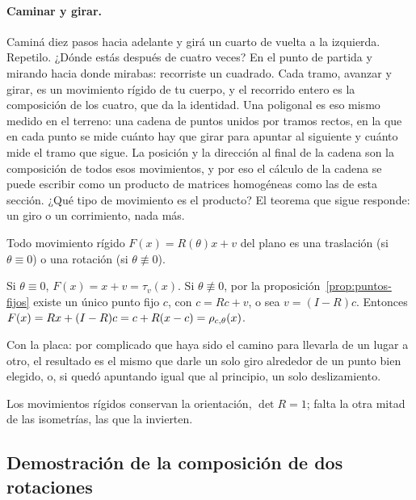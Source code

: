 \paragraph{Caminar y girar.}
Caminá diez pasos hacia adelante y girá un cuarto de vuelta a la izquierda. Repetilo. ¿Dónde
estás después de cuatro veces? En el punto de partida y mirando hacia donde mirabas: recorriste
un cuadrado. Cada tramo, avanzar y girar, es un movimiento rígido de tu cuerpo, y el recorrido
entero es la composición de los cuatro, que da la identidad. Una poligonal es eso mismo medido
en el terreno: una cadena de puntos unidos por tramos rectos, en la que en cada punto se mide
cuánto hay que girar para apuntar al siguiente y cuánto mide el tramo que sigue. La posición y
la dirección al final de la cadena son la composición de todos esos movimientos, y por eso el
cálculo de la cadena se puede escribir como un producto de matrices homogéneas como las de
esta sección. ¿Qué tipo de movimiento es el producto? El teorema que sigue responde: un giro o
un corrimiento, nada más.

\begin{teorema}\label{teo:clasificacion-rigidos}
Todo movimiento rígido \(F(x)=R(\theta)x+v\) del plano es una traslación (si
\(\theta\equiv0\)) o una rotación (si \(\theta\not\equiv0\)).
\end{teorema}

\begin{demostracion}
Si \(\theta\equiv0\), \(F(x)=x+v=\tau_v(x)\). Si \(\theta\not\equiv0\), por la
proposición~\ref{prop:puntos-fijos} existe un único punto fijo \(c\), con \(c=Rc+v\), o sea
\(v=(I-R)c\). Entonces \(F(x)=Rx+(I-R)c=c+R(x-c)=\rho_{c,\theta}(x)\).
\end{demostracion}

Con la placa: por complicado que haya sido el camino para llevarla de un lugar a otro, el
resultado es el mismo que darle un solo giro alrededor de un punto bien elegido, o, si quedó
apuntando igual que al principio, un solo deslizamiento.

Los movimientos rígidos conservan la orientación, \(\det R=1\); falta la otra mitad de las
isometrías, las que la invierten.

\subsection{Demostración de la composición de dos rotaciones}\label{sec:demo-composicion-rotaciones}

